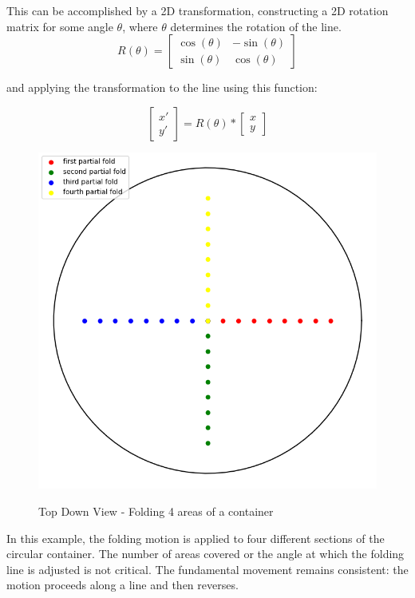 This can be accomplished by a 2D transformation, constructing a 2D rotation matrix for some angle $\theta$, where $\theta$ determines the rotation of the line.
\[R(\theta) = \begin{bmatrix}
    \cos(\theta) & -\sin(\theta) \\
    \sin(\theta) & \cos(\theta)
     \end{bmatrix}
 \] 

and applying the transformation to the line using this function:

\[\begin{bmatrix} x' \\ y' \end{bmatrix} = R(\theta) * \begin{bmatrix} x \\ y \end{bmatrix}\]

\begin{figure}[H]
    \includegraphics[scale=0.35]{Graphics/motions/folding0.png}
    \centering
    \label{fig:foldingMotion1}
    \caption{Top Down View - Folding 4 areas of a container}
\end{figure}

In this example, the folding motion is applied to four different sections of the circular container.
The number of areas covered or the angle at which the folding line is adjusted is not critical.
The fundamental movement remains consistent: the motion proceeds along a line and then reverses.


